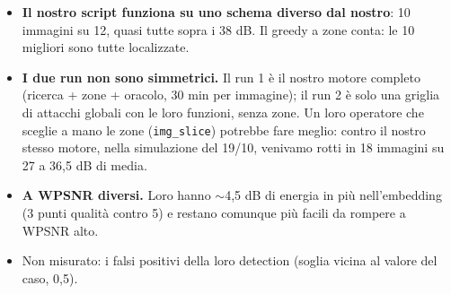 \documentclass[10pt,a4paper]{article}
\begin{document}
\begin{itemize}\itemsep1pt
\item \textbf{Il nostro script funziona su uno schema diverso dal nostro}: 10 immagini su 12, quasi tutte sopra i 38 dB. Il greedy a zone conta: le 10 migliori sono tutte localizzate.
\item \textbf{I due run non sono simmetrici.} Il run 1 è il nostro motore completo (ricerca + zone + oracolo, 30 min per immagine); il run 2 è solo una griglia di attacchi globali con le loro funzioni, senza zone. Un loro operatore che sceglie a mano le zone (\texttt{img\_slice}) potrebbe fare meglio: contro il nostro stesso motore, nella simulazione del 19/10, venivamo rotti in 18 immagini su 27 a 36,5 dB di media.
\item \textbf{A WPSNR diversi.} Loro hanno $\sim$4,5 dB di energia in più nell'embedding (3 punti qualità contro 5) e restano comunque più facili da rompere a WPSNR alto.
\item Non misurato: i falsi positivi della loro detection (soglia vicina al valore del caso, 0,5).
\end{itemize}
\end{document}
